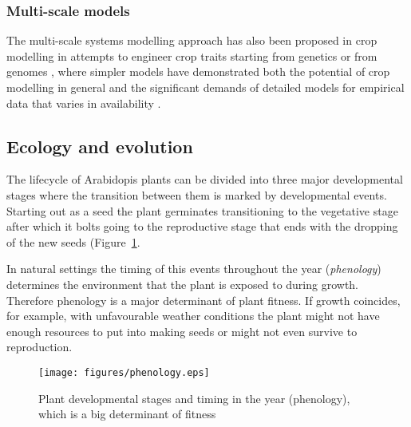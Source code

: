 \subsubsection*{Multi-scale models}
The multi-scale systems modelling approach has also been proposed in crop
modelling in attempts to engineer crop traits starting from genetics or from
genomes \citep{welch_merging_2005, yin_applying_nodate, yin_modelling_2010,
  parent_can_2014, wu_connecting_2016, chenu_integrating_2018}, where simpler
models have demonstrated both the potential of crop modelling in general and the
significant demands of detailed models for empirical data that varies in
availability \citep{hammer_models_2006,asseng_uncertainty_2013}.


\subsection{Ecology and evolution}
%
The lifecycle of Arabidopis plants can be divided into three major
developmental stages where the transition between them is marked by
developmental events. Starting out as a seed the plant germinates transitioning
to the vegetative stage after which it bolts going to the reproductive stage
that ends with the dropping of the new seeds (Figure~\ref{fig:plantLife}.

In natural settings the timing of this events throughout the year
(\emph{phenology}) determines the environment that the plant is exposed to
during growth. Therefore phenology is a major determinant of plant fitness. If
growth coincides, for example, with unfavourable weather conditions the plant
might not have enough resources to put into making seeds or might not even
survive to reproduction.

\begin{figure}[tb]
\centering
\texttt{[image: figures/phenology.eps]}
  \caption{Plant developmental stages and timing in the year (phenology), which
    is a big determinant of fitness}
\label{fig:plantLife}
\end{figure}

